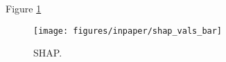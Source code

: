 \documentclass[preprint,12pt]{elsarticle}
\begin{document}
Figure \ref{fig:SHAPbar}


\begin{figure}[!htb]
        \centering
        \texttt{[image: figures/inpaper/shap\_vals\_bar]}
        \caption{SHAP.} 
        \label{fig:SHAPbar}
\end{figure}
\end{document}
